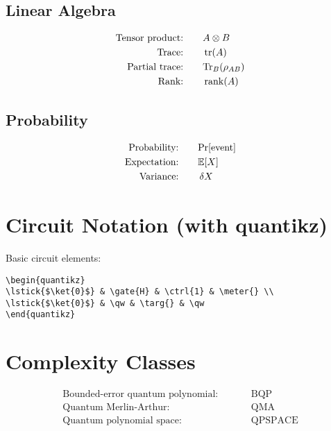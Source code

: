 \documentclass[12pt]{article}
\newcommand{\tensor}{\otimes}
\newcommand{\ptr}[1]{\text{Tr}_{#1}}
\newcommand{\BQP}{\text{BQP}}
\newcommand{\QMA}{\text{QMA}}
\newcommand{\QPSPACE}{\text{QPSPACE}}
\newcommand{\prob}[1]{\text{Pr}[#1]}
\newcommand{\expect}[1]{\mathbb{E}[#1]}
\theoremstyle{definition}
\theoremstyle{remark}
\begin{document}
\begin{multicols}{2}
\subsection{Linear Algebra}
\begin{alignat}{2}
\text{Tensor product:}  &\quad && A \tensor B \\
\text{Trace:}           &\quad && \tr(A) \\
\text{Partial trace:}   &\quad && \ptr{B}(\rho_{AB}) \\
\text{Rank:}            &\quad && \rank(A)
\end{alignat}

\subsection{Probability}
\begin{alignat}{2}
\text{Probability:}  &\quad && \prob{\text{event}} \\
\text{Expectation:}  &\quad && \expect{X} \\
\text{Variance:}     &\quad && \var{X}
\end{alignat}

\end{multicols}


\section{Circuit Notation (with quantikz)}

Basic circuit elements:
\begin{verbatim}
\begin{quantikz}
\lstick{$\ket{0}$} & \gate{H} & \ctrl{1} & \meter{} \\
\lstick{$\ket{0}$} & \qw & \targ{} & \qw
\end{quantikz}
\end{verbatim}

\section{Complexity Classes}

\begin{alignat}{2}
\text{Bounded-error quantum polynomial:} &\quad && \BQP \\
\text{Quantum Merlin-Arthur:}           &\quad && \QMA \\
\text{Quantum polynomial space:}        &\quad && \QPSPACE
\end{alignat}
\end{document}
